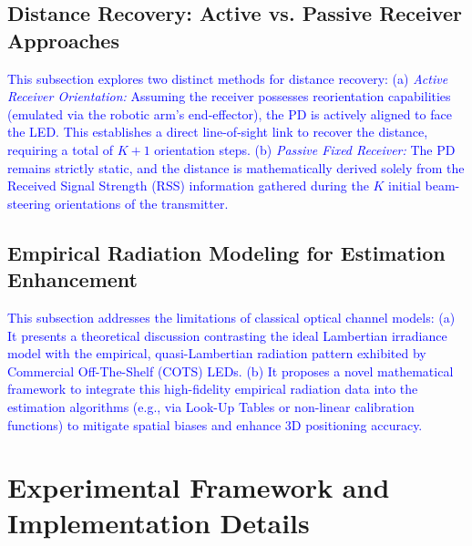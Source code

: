\documentclass[journal]{IEEEtran}
\begin{document}
    \subsection{Distance Recovery: Active vs. Passive Receiver Approaches}
    \textcolor{blue}{This subsection explores two distinct methods for distance recovery: 
    (a) \textit{Active Receiver Orientation:} Assuming the receiver possesses reorientation capabilities (emulated via the robotic arm's end-effector), the PD is actively aligned to face the LED. This establishes a direct line-of-sight link to recover the distance, requiring a total of $K+1$ orientation steps.
    (b) \textit{Passive Fixed Receiver:} The PD remains strictly static, and the distance is mathematically derived solely from the Received Signal Strength (RSS) information gathered during the $K$ initial beam-steering orientations of the transmitter.}

    \subsection{Empirical Radiation Modeling for Estimation Enhancement}
    \textcolor{blue}{This subsection addresses the limitations of classical optical channel models:
    (a) It presents a theoretical discussion contrasting the ideal Lambertian irradiance model with the empirical, quasi-Lambertian radiation pattern exhibited by Commercial Off-The-Shelf (COTS) LEDs.
    (b) It proposes a novel mathematical framework to integrate this high-fidelity empirical radiation data into the estimation algorithms (e.g., via Look-Up Tables or non-linear calibration functions) to mitigate spatial biases and enhance 3D positioning accuracy.}

\section{Experimental Framework and Implementation Details}
\end{document}
